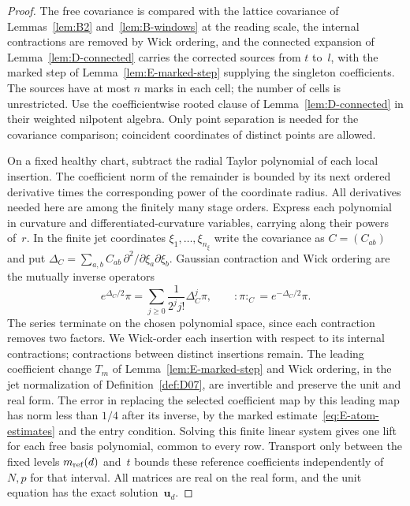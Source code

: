 \begin{proof}
The free covariance is compared with the lattice covariance of Lemmas~\ref{lem:B2} and~\ref{lem:B-windows} at the reading scale, the internal contractions are removed by Wick ordering, and the connected expansion of Lemma~\ref{lem:D-connected} carries the corrected sources from $t$ to~$l$, with the marked step of Lemma~\ref{lem:E-marked-step} supplying the singleton coefficients. The sources have at most $n$ marks in each cell; the number of cells is unrestricted. Use the coefficientwise rooted clause of Lemma~\ref{lem:D-connected} in their weighted nilpotent algebra. Only point separation is needed for the covariance comparison; coincident coordinates of distinct points are allowed.


On a fixed healthy chart, subtract the radial Taylor polynomial of each local insertion. The coefficient norm of the remainder is bounded by its next ordered derivative times the corresponding power of the coordinate radius. All derivatives needed here are among the finitely many stage orders. Express each polynomial in curvature and differentiated-curvature variables, carrying along their powers of~$r$. In the finite jet coordinates $\xi_1,\ldots,\xi_{n_\xi}$ write the covariance as $C=(C_{ab})$ and put $\Delta_C=\sum_{a,b}C_{ab}\,\partial^2/\partial\xi_a\partial\xi_b$. Gaussian contraction and Wick ordering are the mutually inverse operators
\begin{equation*}
 e^{\Delta_C/2}\pi=\sum_{j\ge0}\frac1{2^jj!}\Delta_C^j\pi,
 \qquad {:}\pi{:}_C=e^{-\Delta_C/2}\pi.
\end{equation*}
The series terminate on the chosen polynomial space, since each contraction removes two factors. We Wick-order each insertion with respect to its internal contractions; contractions between distinct insertions remain. The leading coefficient change $T_m$ of Lemma~\ref{lem:E-marked-step} and Wick ordering, in the jet normalization of Definition~\ref{def:D07}, are invertible and preserve the unit and real form. The error in replacing the selected coefficient map by this leading map has norm less than $1/4$ after its inverse, by the marked estimate~\eqref{eq:E-atom-estimates} and the entry condition. Solving this finite linear system gives one lift for each free basis polynomial, common to every row. Transport only between the fixed levels $m_{\mathrm{ref}}(d)$ and~$t$ bounds these reference coefficients independently of~$N,p$ for that interval. All matrices are real on the real form, and the unit equation has the exact solution~$\mathbf u_d$.


\end{proof}

